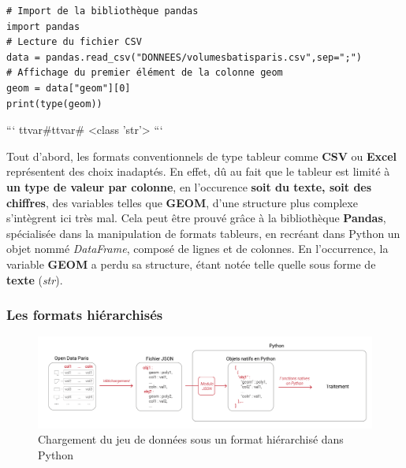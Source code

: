\documentclass[
  11pt,
  french,
]{article}
\begin{document}
\begin{tcolorbox}[title= Chargement du jeu de données sous un format tabulaire dans Python ,colback=boitecode]
\begin{lstlisting}[style=code]
# Import de la bibliothèque pandas
import pandas
# Lecture du fichier CSV
data = pandas.read_csv("DONNEES/volumesbatisparis.csv",sep=";")
# Affichage du premier élément de la colonne geom
geom = data["geom"][0]
print(type(geom))\end{lstlisting}

```
ttvar{#}ttvar{#} <class 'str'>
```

\end{tcolorbox}

Tout d'abord, les formats conventionnels de type tableur comme
\textbf{CSV} ou \textbf{Excel} représentent des choix inadaptés. En
effet, dû au fait que le tableur est limité à \textbf{un type de valeur
par colonne}, en l'occurence \textbf{soit du texte, soit des chiffres},
des variables telles que \textbf{GEOM}, d'une structure plus complexe
s'intègrent ici très mal. Cela peut être prouvé grâce à la bibliothèque
\textbf{Pandas}, spécialisée dans la manipulation de formats tableurs,
en recréant dans Python un objet nommé \emph{DataFrame}, composé de
lignes et de colonnes. En l'occurrence, la variable \textbf{GEOM} a
perdu sa structure, étant notée telle quelle sous forme de
\textbf{texte} (\emph{str}).

\hypertarget{les-formats-hiuxe9rarchisuxe9s}{%
\subsubsection{Les formats
hiérarchisés}\label{les-formats-hiuxe9rarchisuxe9s}}

\begin{tcolorbox}
\begin{figure}

{\centering \includegraphics[width=0.9\linewidth]{__imgs/io_json} 

}

\caption[Chargement du jeu de données sous un format hiérarchisé dans Python  -  réalisation personnelle]{Chargement du jeu de données sous un format hiérarchisé dans Python}\label{fig:io_json}
\end{figure}
\end{tcolorbox}
\end{document}
